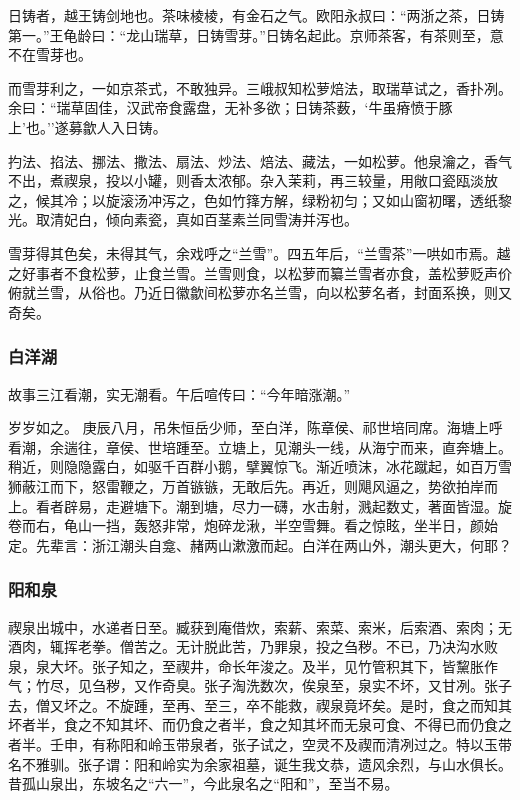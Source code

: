\documentclass[]{article}
\begin{document}
日铸者，越王铸剑地也。茶味棱棱，有金石之气。欧阳永叔曰：``两浙之茶，日铸第一。''王龟龄曰：``龙山瑞草，日铸雪芽。''日铸名起此。京师茶客，有茶则至，意不在雪芽也。

而雪芽利之，一如京茶式，不敢独异。三峨叔知松萝焙法，取瑞草试之，香扑冽。余曰：``瑞草固佳，汉武帝食露盘，无补多欲；日铸茶薮，`牛虽瘠愤于豚上'也。''遂募歙人入日铸。

扚法、掐法、挪法、撒法、扇法、炒法、焙法、藏法，一如松萝。他泉瀹之，香气不出，煮禊泉，投以小罐，则香太浓郁。杂入茉莉，再三较量，用敞口瓷瓯淡放之，候其冷；以旋滚汤冲泻之，色如竹箨方解，绿粉初匀；又如山窗初曙，透纸黎光。取清妃白，倾向素瓷，真如百茎素兰同雪涛并泻也。

雪芽得其色矣，未得其气，余戏呼之``兰雪''。四五年后，``兰雪茶''一哄如市焉。越之好事者不食松萝，止食兰雪。兰雪则食，以松萝而纂兰雪者亦食，盖松萝贬声价俯就兰雪，从俗也。乃近日徽歙间松萝亦名兰雪，向以松萝名者，封面系换，则又奇矣。

\hypertarget{header-n211}{%
\subsubsection{白洋湖}\label{header-n211}}

故事三江看潮，实无潮看。午后喧传曰：``今年暗涨潮。''

岁岁如之。
庚辰八月，吊朱恒岳少师，至白洋，陈章侯、祁世培同席。海塘上呼看潮，余遄往，章侯、世培踵至。立塘上，见潮头一线，从海宁而来，直奔塘上。稍近，则隐隐露白，如驱千百群小鹅，擘翼惊飞。渐近喷沫，冰花蹴起，如百万雪狮蔽江而下，怒雷鞭之，万首镞镞，无敢后先。再近，则飓风逼之，势欲拍岸而上。看者辟易，走避塘下。潮到塘，尽力一礴，水击射，溅起数丈，著面皆湿。旋卷而右，龟山一挡，轰怒非常，炮碎龙湫，半空雪舞。看之惊眩，坐半日，颜始定。先辈言：浙江潮头自龛、赭两山漱激而起。白洋在两山外，潮头更大，何耶？

\hypertarget{header-n217}{%
\subsubsection{阳和泉}\label{header-n217}}

禊泉出城中，水递者日至。臧获到庵借炊，索薪、索菜、索米，后索酒、索肉；无酒肉，辄挥老拳。僧苦之。无计脱此苦，乃罪泉，投之刍秽。不已，乃决沟水败泉，泉大坏。张子知之，至禊井，命长年浚之。及半，见竹管积其下，皆黧胀作气；竹尽，见刍秽，又作奇臭。张子淘洗数次，俟泉至，泉实不坏，又甘冽。张子去，僧又坏之。不旋踵，至再、至三，卒不能救，禊泉竟坏矣。是时，食之而知其坏者半，食之不知其坏、而仍食之者半，食之知其坏而无泉可食、不得已而仍食之者半。壬申，有称阳和岭玉带泉者，张子试之，空灵不及禊而清冽过之。特以玉带名不雅驯。张子谓：阳和岭实为余家祖墓，诞生我文恭，遗风余烈，与山水俱长。昔孤山泉出，东坡名之``六一''，今此泉名之``阳和''，至当不易。
\end{document}
